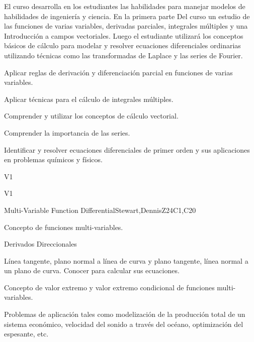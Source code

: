\begin{syllabus}


\begin{justification}

El curso desarrolla en los estudiantes las habilidades para manejar modelos de habilidades de ingeniería y ciencia. En la primera parte
Del curso un estudio de las funciones de varias variables, derivadas parciales, integrales múltiples y una
Introducción a campos vectoriales. Luego el estudiante utilizará los conceptos básicos de cálculo para modelar y resolver ecuaciones diferenciales ordinarias utilizando técnicas como las transformadas de Laplace y las series de Fourier.

\end{justification}

\begin{goals}
  \item Aplicar reglas de derivación y diferenciación parcial en funciones de varias variables.
  \item Aplicar técnicas para el cálculo de integrales múltiples.
  \item Comprender y utilizar los conceptos de cálculo vectorial.
  \item Comprender la importancia de las series.
  \item Identificar y resolver ecuaciones diferenciales de primer orden y sus aplicaciones en problemas químicos y físicos.
\end{goals}

\begin{outcomes}{V1}
    \item {}  
    \item {}
\end{outcomes}

\begin{competences}{V1}
    \item {}
    \item {}
\end{competences}

\begin{unit}{Multi-Variable Function Differential}{}{Stewart,DennisZ}{24}{C1,C20}
   \begin{topics}      
    \item Concepto de funciones multi-variables.
    \item Derivados Direccionales
    \item Línea tangente, plano normal a línea de curva y plano tangente, línea normal a un plano de curva. Conocer para calcular sus ecuaciones.
    \item Concepto de valor extremo y valor extremo condicional de funciones multi-variables.
    \item Problemas de aplicación tales como modelización de la producción total de un sistema económico, velocidad del sonido a través del océano, optimización del espesante, etc.
      \end{topics}


\end{unit}
\end{syllabus}

